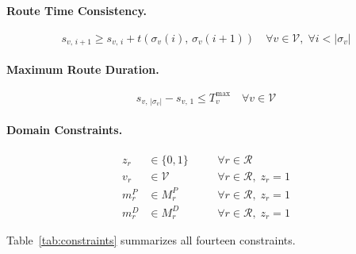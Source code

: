 \paragraph{Route Time Consistency.}
\begin{equation}\label{con:time-consistency}
  s_{v,\, i+1} \geq s_{v,\, i} + t(\sigma_v(i),\, \sigma_v(i+1))
  \quad \forall v \in \mathcal{V},\; \forall i < |\sigma_v|
\end{equation}

\paragraph{Maximum Route Duration.}
\begin{equation}\label{con:route-duration}
  s_{v,\, |\sigma_v|} - s_{v,\, 1} \leq T_v^{\max} \quad \forall v \in \mathcal{V}
\end{equation}

\paragraph{Domain Constraints.}
\begin{align}
  z_r &\in \{0,1\} \quad &&\forall r \in \mathcal{R} \label{con:binary-z}\\
  v_r &\in \mathcal{V} \quad &&\forall r \in \mathcal{R},\; z_r = 1 \label{con:domain-v}\\
  m_r^P &\in M_r^P \quad &&\forall r \in \mathcal{R},\; z_r = 1 \label{con:domain-mp}\\
  m_r^D &\in M_r^D \quad &&\forall r \in \mathcal{R},\; z_r = 1 \label{con:domain-md}
\end{align}

Table~\ref{tab:constraints} summarizes all fourteen constraints.

